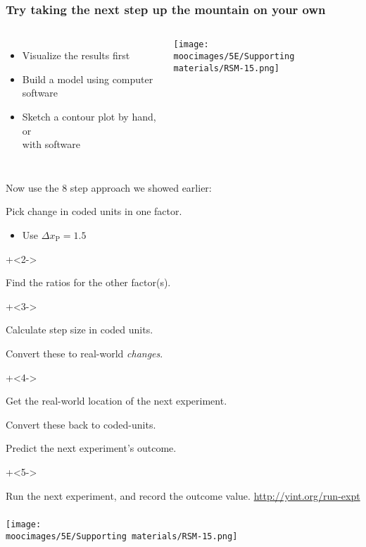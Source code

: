 \documentclass[handout,11pt,aspectratio=169,mathserif]{beamer}
\begin{document}
\begin{frame}\frametitle{Try taking the next step up the mountain on your own}
	
	\begin{columns}[T]
		
			\begin{itemize}
				\item	Visualize the results first
				\item	Build a model using computer software
				\item	Sketch a contour plot by hand, or \\with software
			\end{itemize}
			\centerline{\texttt{[image: \\moocimages/5E/Supporting materials/RSM-15.png]}}
	\end{columns}
	
	\pause
	\vspace{-2.5cm}
	{\color{myOrange}Now use the 8 step approach we showed earlier:}
	\vspace{0.2cm}
	\begin{enumerate}

			\item	Pick change in coded units in one factor. 
				\begin{itemize}
					\item	Use $\Delta x_\text{P}= 1.5$
				\end{itemize}
			\onslide+<2->{
				\item	Find the ratios for the other factor(s).
			}
			\onslide+<3->{
				\item	Calculate step size in coded units.
				\item	Convert these to real-world \emph{changes}.
			}
			\onslide+<4->{
				\item	Get the real-world location	of the next experiment.
				\item	Convert these back to coded-units.
				\item	Predict the next experiment's outcome.
			}
			\onslide+<5->{
				\item	Run the next experiment, and record the outcome value.  \href{http://yint.org/run-expt}{http://yint.org/run-expt}
			}
	\end{enumerate}
	
\end{frame}

\begin{frame}\frametitle{}
	\centerline{\texttt{[image: \\moocimages/5E/Supporting materials/RSM-15.png]}}
\end{frame}
\end{document}
